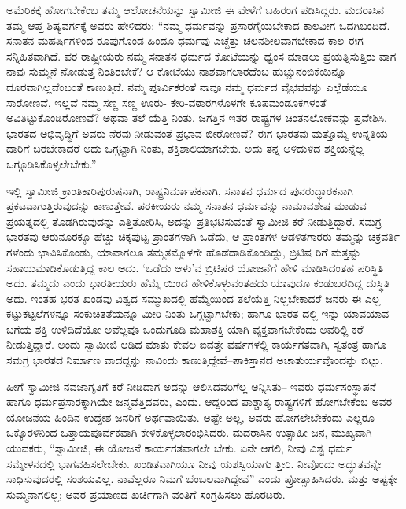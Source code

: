ಅಮೆರಿಕಕ್ಕೆ ಹೋಗಬೇಕೆಂಬ ತಮ್ಮ ಆಲೋಚನೆಯನ್ನು ಸ್ವಾಮೀಜಿ ಈ ವೇಳೆಗೆ ಬಹಿರಂಗ ಪಡಿಸಿದ್ದರು. ಮದರಾಸಿನ ತಮ್ಮ ಆಪ್ತ ಶಿಷ್ಯವರ್ಗಕ್ಕೆ ಅವರು ಹೇಳಿದರು: “ನಮ್ಮ ಧರ್ಮವನ್ನು ಪ್ರಸಾರಗೈಯಬೇಕಾದ ಕಾಲವೀಗ ಒದಗಿಬಂದಿದೆ. ಸನಾತನ ಮಹರ್ಷಿಗಳಿಂದ ರೂಪುಗೊಂಡ ಹಿಂದೂ ಧರ್ಮವು ಎಚ್ಚೆತ್ತು ಚಲನಶೀಲವಾಗಬೇಕಾದ ಕಾಲ ಈಗ ಸನ್ನಿಹಿತವಾಗಿದೆ. ಪರ ರಾಷ್ಟ್ರೀಯರು ನಮ್ಮ ಸನಾತನ ಧರ್ಮದ ಕೋಟೆಯನ್ನು ಧ್ವಂಸ ಮಾಡಲು ಪ್ರಯತ್ನಿಸುತ್ತಿರು ವಾಗ ನಾವು ಸುಮ್ಮನೆ ನೋಡುತ್ತ ನಿಂತಿರಬೇಕೆ? ಆ ಕೋಟೆಯು ನಾಶವಾಗಲಾರದೆಂಬ ಹುಚ್ಚುನಂಬಿಕೆಯಿನ್ನೂ ದೂರವಾಗಿಲ್ಲವೆಂಬಂತೆ ಕಾಣುತ್ತಿದೆ. ನಮ್ಮ ಪೂರ್ವಿಕರಂತೆ ನಾವೂ ನಮ್ಮ ಧರ್ಮದ ವೈಭವವನ್ನು ಎಲ್ಲೆಡೆಯೂ ಸಾರೋಣವೆ, ಇಲ್ಲವೆ ನಮ್ಮ ಸಣ್ಣ ಸಣ್ಣ ಊರು- ಕೇರಿ-ವಠಾರಗಳೊಳಗೇ ಕೂಪಮಂಡೂಕಗಳಂತೆ ಅವಿತಿಟ್ಟುಕೊಂಡಿರೋಣವೆ? ಅಥವಾ ತಲೆ ಯೆತ್ತಿ ನಿಂತು, ಜಗತ್ತಿನ ಇತರ ರಾಷ್ಟ್ರಗಳ ಚಿಂತನಲೋಕವನ್ನು ಪ್ರವೇಶಿಸಿ, ಭಾರತದ ಅಭಿವೃದ್ಧಿಗೆ ಅವರು ನೆರವು ನೀಡುವಂತೆ ಪ್ರಭಾವ ಬೀರೋಣವೆ? ಈಗ ಭಾರತವು ಮತ್ತೊಮ್ಮೆ ಉನ್ನತಿಯ ದಾರಿಗೆ ಬರಬೇಕಾದರೆ ಅದು ಒಗ್ಗಟ್ಟಾಗಿ ನಿಂತು, ಶಕ್ತಿಶಾಲಿಯಾಗಬೇಕು. ಅದು ತನ್ನ ಅಳಿದುಳಿದ ಶಕ್ತಿಯನ್ನೆಲ್ಲ ಒಗ್ಗೂಡಿಸಿಕೊಳ್ಳಲೇಬೇಕು.”

ಇಲ್ಲಿ ಸ್ವಾಮೀಜಿ ಕ್ರಾಂತಿಕಾರಿಪುರುಷನಾಗಿ, ರಾಷ್ಟ್ರನಿರ್ಮಾಪಕನಾಗಿ, ಸನಾತನ ಧರ್ಮದ ಪುನರುದ್ಧಾರಕನಾಗಿ ಪ್ರಕಟವಾಗುತ್ತಿರುವುದನ್ನು ಕಾಣುತ್ತೇವೆ. ಪರಕೀಯರು ನಮ್ಮ ಸನಾತನ ಧರ್ಮವನ್ನು ನಾಮಾವಶೇಷ ಮಾಡುವ ಪ್ರಯತ್ನದಲ್ಲಿ ತೊಡಗಿರುವುದನ್ನು ಎತ್ತಿತೋರಿಸಿ, ಅದನ್ನು ಪ್ರತಿಭಟಿಸುವಂತೆ ಸ್ವಾಮೀಜಿ ಕರೆ ನೀಡುತ್ತಿದ್ದಾರೆ. ಸಮಗ್ರ ಭಾರತವು ಆರುನೂರಕ್ಕೂ ಹೆಚ್ಚು ಚಿಕ್ಕಪುಟ್ಟ ಪ್ರಾಂತಗಳಾಗಿ ಒಡೆದು, ಆ ಪ್ರಾಂತಗಳ ಆಡಳಿತಗಾರರು ತಮ್ಮನ್ನು ಚಕ್ರವರ್ತಿ ಗಳೆಂದು ಭಾವಿಸಿಕೊಂಡು, ಯಾವಾಗಲೂ ತಮ್ಮತಮ್ಮೊಳಗೇ ಹೊಡೆದಾಡಿಕೊಂಡಿದ್ದು, ಬ್ರಿಟಿಷ ರಿಗೆ ಮತ್ತಷ್ಟು ಸಹಾಯಮಾಡಿಕೊಡುತ್ತಿದ್ದ ಕಾಲ ಅದು. ‘ಒಡೆದು ಆಳು’ವ ಬ್ರಿಟಿಷರ ಯೋಜನೆಗೆ ಹೇಳಿ ಮಾಡಿಸಿದಂತಹ ಪರಿಸ್ಥಿತಿ ಅದು. ತಮ್ಮದು ಎಂದು ಭಾರತೀಯರು ಹೆಮ್ಮೆ ಯಿಂದ ಹೇಳಿಕೊಳ್ಳುವಂತಹದು ಯಾವುದೂ ಕಂಡುಬರದಿದ್ದ ದುಸ್ಥಿತಿ ಅದು. ಇಂತಹ ಭರತ ಖಂಡವು ವಿಶ್ವದ ಸಮ್ಮುಖದಲ್ಲಿ ಹೆಮ್ಮೆಯಿಂದ ತಲೆಯೆತ್ತಿ ನಿಲ್ಲಬೇಕಾದರೆ ಜನರು ಈ ಎಲ್ಲ ಕಟ್ಟುಕಟ್ಟಲೆಗಳನ್ನೂ ಸಂಕುಚಿತತೆಯನ್ನೂ ಮೀರಿ ನಿಂತು ಒಗ್ಗಟ್ಟಾಗಬೇಕು; ಹಾಗೂ ಭಾರತ ದಲ್ಲಿ ಇನ್ನು ಯಾವಯಾವ ಬಗೆಯ ಶಕ್ತಿ ಉಳಿದಿದೆಯೋ ಅವೆಲ್ಲವೂ ಒಂದುಗೂಡಿ ಮಹಾಶಕ್ತಿ ಯಾಗಿ ವ್ಯಕ್ತವಾಗಬೇಕೆಂದು ಅವರಿಲ್ಲಿ ಕರೆ ನೀಡುತ್ತಿದ್ದಾರೆ. ಅಂದು ಸ್ವಾಮೀಜಿ ಆಡಿದ ಮಾತು ಕೇವಲ ಐವತ್ತೇ ವರ್ಷಗಳಲ್ಲಿ ಕಾರ್ಯಗತವಾಗಿ, ಸ್ವತಂತ್ರ ಹಾಗೂ ಸಮಗ್ರ ಭಾರತದ ನಿರ್ಮಾಣ ವಾದದ್ದನ್ನು ನಾವಿಂದು ಕಾಣುತ್ತಿದ್ದೇವೆ–ಪಾಕಿಸ್ತಾನದ ಅಚಾತುರ್ಯವೊಂದನ್ನು ಬಿಟ್ಟು.

ಹೀಗೆ ಸ್ವಾಮೀಜಿ ನವಜಾಗೃತಿಗೆ ಕರೆ ನೀಡಿದಾಗ ಅದನ್ನು ಆಲಿಸಿದವರಿಗೆಲ್ಲ ಅನ್ನಿಸಿತು– ಇವರು ಧರ್ಮಸಂಸ್ಥಾಪನೆ ಹಾಗೂ ಧರ್ಮಪ್ರಸಾರಕ್ಕಾಗಿಯೇ ಜನ್ಮವೆತ್ತಿದವರು, ಎಂದು. ಆದ್ದರಿಂದ ಪಾಶ್ಚಾತ್ಯ ರಾಷ್ಟ್ರಗಳಿಗೆ ಹೋಗಬೇಕೆಂಬ ಅವರ ಯೋಜನೆಯ ಹಿಂದಿನ ಉದ್ದೇಶ ಜನರಿಗೆ ಅರ್ಥವಾಯಿತು. ಅಷ್ಟೇ ಅಲ್ಲ, ಅವರು ಹೋಗಲೇಬೇಕೆಂದು ಎಲ್ಲರೂ ಒಕ್ಕೊರಳಿನಿಂದ ಒತ್ತಾಯಪೂರ್ವಕವಾಗಿ ಕೇಳಿಕೊಳ್ಳಲಾರಂಭಿಸಿದರು. ಮದರಾಸಿನ ಉತ್ಸಾಹೀ ಜನ, ಮುಖ್ಯವಾಗಿ ಯುವಕರು, “ಸ್ವಾಮೀಜಿ, ಈ ಯೋಜನೆ ಕಾರ್ಯಗತವಾಗಲೇ ಬೇಕು. ಏನೇ ಆಗಲಿ, ನೀವು ವಿಶ್ವ ಧರ್ಮ ಸಮ್ಮೇಳನದಲ್ಲಿ ಭಾಗವಹಿಸಲೇಬೇಕು. ಖಂಡಿತವಾಗಿಯೂ ನೀವು ಯಶಸ್ವಿಯಾಗು ತ್ತೀರಿ. ನೀವೊಂದು ಅದ್ಭುತವನ್ನೇ ಸಾಧಿಸುವುದರಲ್ಲಿ ಸಂಶಯವಿಲ್ಲ. ನಾವೆಲ್ಲರೂ ನಿಮಗೆ ಬೆಂಬಲವಾಗಿದ್ದೇವೆ” ಎಂದು ಪ್ರೋತ್ಸಾಹಿಸಿದರು. ಮತ್ತು ಅಷ್ಟಕ್ಕೇ ಸುಮ್ಮನಾಗಲಿಲ್ಲ; ಅವರ ಪ್ರಯಾಣದ ಖರ್ಚಿಗಾಗಿ ವಂತಿಗೆ ಸಂಗ್ರಹಿಸಲು ಹೊರಟರು.

